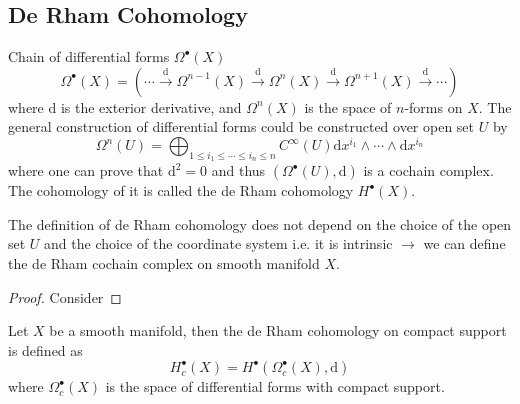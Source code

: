 \documentclass[10pt]{article}
\begin{document}
\subsection{De Rham Cohomology}

Chain of differential forms $ \Omega^{\bullet}(X)$
\begin{equation}\label{eq:deRhamChain}
  \Omega^{\bullet}(X) = \left( \cdots \xrightarrow{\mathrm{d}} \Omega^{n-1}(X) \xrightarrow{\mathrm{d}} \Omega^{n}(X) \xrightarrow{\mathrm{d}} \Omega^{n+1}(X) \xrightarrow{\mathrm{d}} \cdots \right)
\end{equation}
where $ \mathrm{d} $ is the exterior derivative, and $ \Omega^{n}(X)$ is the space of $ n$-forms on $ X$. The general construction of differential forms could be constructed over open set $ U$ by
\begin{equation*}
  \Omega^{n}(U) = \bigoplus_{1 \le i_1 \le \cdots \le i_n \le n} C^{\infty }(U) \mathrm{d} x^{i_1} \wedge \cdots \wedge \mathrm{d} x^{i_n}
\end{equation*}
where one can prove that $ \mathrm{d} ^{2} = 0$ and thus $\left( \Omega^{\bullet}(U), \mathrm{d} \right)$  is a cochain complex. The cohomology of it is called the de Rham cohomology $ H^{\bullet}(X)$.
\begin{proposition}
  The definition of de Rham cohomology does not depend on the choice of the open set $U$ and the choice of the coordinate system i.e. it is intrinsic $\longrightarrow$ we can define the de Rham cochain complex on smooth manifold $ X$.
\end{proposition}
\begin{proof}
  Consider
\end{proof}

\begin{definition}
  Let $ X$ be a smooth manifold, then the de Rham cohomology on compact support is defined as
  \begin{equation}
    H^{\bullet}_{c}(X) = H^{\bullet}(\Omega^{\bullet}_{c}(X),\mathrm{d})
  \end{equation}
  where $ \Omega^{\bullet}_{c}(X)$ is the space of differential forms with compact support.
\end{definition}
\end{document}
